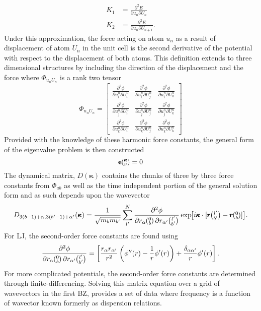 %
\begin{equation}
\begin{split}
	K_1&=\frac{\partial^2 E}{\partial u_n\partial U_{n}}\\
	K_2&=\frac{\partial^2 E}{\partial u_n\partial U_{n+1}}.
\end{split}
\end{equation}
%
Under this approximation, the force acting on atom $u_n$ as a result of displacement of atom $U_n$ in the unit cell is the second derivative of the potential with respect to the displacement of both atoms. This definition extends to three dimensional structures by including the direction of the displacement and the force where $\Phi_{u_nU_n}$ is a rank two tensor
%
\begin{equation}
\Phi_{u_nU_n}=
\begin{bmatrix}
  \frac{\partial^2 \phi}{\partial u^n_i\partial U^n_i} & \frac{\partial^2 \phi}{\partial u^n_i\partial U^n_j} &\frac{\partial^2 \phi}{\partial u^n_i\partial U^n_k}\\
  \frac{\partial^2 \phi}{\partial u^n_j\partial U^n_i} & \frac{\partial^2 \phi}{\partial u^n_j\partial U^n_j} &\frac{\partial^2 \phi}{\partial u^n_j\partial U^n_k}\\
\frac{\partial^2 \phi}{\partial u^n_k\partial U^n_i} & \frac{\partial^2 \phi}{\partial u^n_k\partial U^n_j} &\frac{\partial^2 \phi}{\partial u^n_k\partial U^n_k}
 \end{bmatrix}
\end{equation}
Provided with the knowledge of these harmonic force constants, the general form of the eigenvalue problem is then constructed \cite{dove_introduction_1993-3}
\begin{equation}
[D(\pmb{\kappa})-I\omega^2\kv]\pmb{\mathrm{e}}\kv = 0
\end{equation}
%
The dynamical matrix, $D(\pmb{\kappa})$ contains the chunks of three by three force constants from $\Phi_{ab}$ as well as the time independent portion of the general solution form and as such depends upon the wavevector
\begin{equation}
D_{3(b-1)+\alpha,3(b'-1)+\alpha'}(\pmb{\kappa})=\frac{1}{\sqrt{m_bm_{b'}}}\sum_{l'}^N\frac{\partial^2\phi}{\partial r_\alpha \Ob \partial r_{\alpha'} \lbp} \EXP{i\pmb{\kappa}\cdot [\pmb{r}\lbp-\pmb{r}\Ob]}.
\end{equation}
For LJ, the second-order force constants are found using
\begin{equation}
\frac{\partial^2\phi}{\partial r_\alpha \mspace{-4.0mu}\left(\mspace{-8.0mu} \begin{smallmatrix}&0 \\&b\end{smallmatrix}\mspace{-3.0mu}\right) \partial r_{\alpha'} \mspace{-4.0mu}\left(\mspace{-8.0mu} \begin{smallmatrix}&l' \\&b'\end{smallmatrix}\mspace{-3.0mu}\right)}=\left[\frac{r_{\alpha}r_{\alpha'}}{r^2}\left(\phi''(r)-\frac{1}{r}\phi'(r)\right)+\frac{\delta_{\alpha\alpha'}}{r}\phi'(r)\right].
\end{equation}
For more complicated potentials, the second-order force constants are determined through finite-differencing. Solving this matrix equation over a grid of wavevectors in the first BZ, provides a set of data where frequency is a function of wavector known formerly as dispersion relations.%

